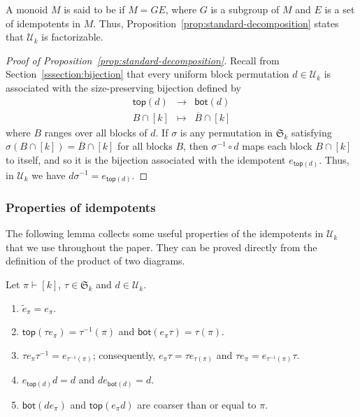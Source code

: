 \begin{remark}
    A monoid $M$ is said to be  if $M = G E$, where $G$ is
    a subgroup of $M$ and $E$ is a set of idempotents in $M$.
    Thus, Proposition~\ref{prop:standard-decomposition} states that
    $\mathcal{U}_k$ is factorizable.
\end{remark}

\begin{proof}[Proof of Proposition~\ref{prop:standard-decomposition}]
    Recall from Section~\ref{sssection:bijection} that every uniform block
    permutation $d \in \mathcal{U}_k$ is associated with the size-preserving
    bijection defined by
    \begin{eqnarray*}
        \mathsf{top}(d) & \longrightarrow & \mathsf{bot}(d)\\
        B \cap [k] & \longmapsto & \overline{B} \cap [k]
    \end{eqnarray*}
    where $B$ ranges over all blocks of $d$.
    If $\sigma$ is any permutation in $\mathfrak{S}_k$ satisfying
    $\sigma(B \cap [k]) = \overline{B} \cap [k]$ for all blocks $B$,
    then $\sigma^{-1} \circ d$ maps each block $B \cap [k]$ to itself,
    and so it is the bijection associated with the idempotent $e_{\mathsf{top}(d)}$.
    Thus, in $\mathcal{U}_k$ we have $d \sigma^{-1} = e_{\mathsf{top}(d)}$.
\end{proof}

\subsubsection{Properties of idempotents}

The following lemma collects some useful properties of the idempotents in
$\mathcal{U}_k$ that we use throughout the paper.
They can be proved directly from the definition of the product of two diagrams.

\begin{lemma}\label{lem:eproperties}
Let $\pi\vdash [k]$, $\tau\in \mathfrak{S}_k$ and $d \in \mathcal{U}_k$.
\begin{enumerate}[label=(\alph*)]
\item $\widetilde{e}_\pi = e_\pi$.
\item $\mathsf{top}(\tau e_\pi) = \tau^{-1}(\pi)$ and $\mathsf{bot}(e_\pi\tau) = \tau(\pi)$.
\item $\tau e_\pi \tau^{-1} = e_{\tau^{-1}(\pi)}$; consequently, $e_\pi \tau = \tau e_{\tau(\pi)}$ and $\tau e_\pi  =  e_{\tau^{-1}(\pi)}\tau$.
\item $e_{\mathsf{top}(d)} d = d$ and $de_{\mathsf{bot}(d)} = d$.
\item $\mathsf{bot}(d e_\pi)$ and $\mathsf{top}(e_\pi d)$ are coarser than or equal to $\pi$.
\end{enumerate}
\end{lemma}

